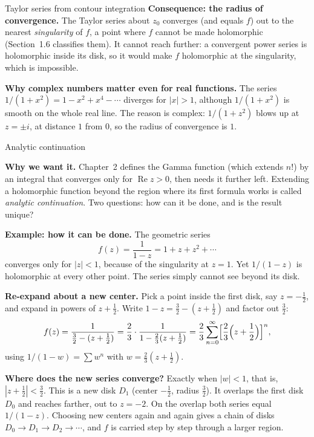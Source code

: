 \documentclass[11pt]{beamer}
\begin{document}
\begin{frame}[allowframebreaks=1.00]{Taylor series from contour integration}
\textbf{Consequence: the radius of convergence.} The Taylor series about \(z_0\) converges (and
equals \(f\)) out to the nearest \emph{singularity} of \(f\), a point where \(f\) cannot be made
holomorphic (Section~1.6 classifies them). It cannot reach further: a convergent power series is
holomorphic inside its disk, so it would make \(f\) holomorphic at the singularity, which is impossible.

\textbf{Why complex numbers matter even for real functions.} The series
\(1/(1+x^2)=1-x^2+x^4-\cdots\) diverges for \(|x|>1\), although \(1/(1+x^2)\) is smooth on the whole
real line. The reason is complex: \(1/(1+z^2)\) blows up at
\(z=\pm i\), at distance \(1\) from \(0\), so the radius of convergence is \(1\).
\end{frame}

\begin{frame}[allowframebreaks=1.00]{Analytic continuation}
\footnotesize

\textbf{Why we want it.} Chapter~2 defines the Gamma function (which extends \(n!\)) by an integral
that converges only for \(\operatorname{Re}z>0\), then needs it further left. Extending a holomorphic
function beyond the region where its first formula works is called \emph{analytic continuation}.
Two questions: how can it be done, and is the result unique?

\textbf{Example: how it can be done.} The geometric series
\[
 f(z)=\frac1{1-z}=1+z+z^2+\cdots
\]
converges only for \(|z|<1\), because of the singularity at \(z=1\). Yet \(1/(1-z)\) is holomorphic at
every other point. The series simply cannot see beyond its disk.

\textbf{Re-expand about a new center.} Pick a point inside the first disk, say \(z=-\tfrac12\), and
expand in powers of \(z+\tfrac12\). Write \(1-z=\tfrac32-(z+\tfrac12)\) and factor out \(\tfrac32\):
\[
    f(z)
    =\frac{1}{\frac32-(z+\frac12)}
    =\frac23\cdot
      \frac{1}{1-\frac23(z+\frac12)}
    =\frac23\sum_{n=0}^{\infty}
      \Bigl[\frac23\Bigl(z+\frac12\Bigr)\Bigr]^n,
\]
using \(1/(1-w)=\sum w^n\) with \(w=\frac23(z+\frac12)\).
\par\framebreak\par
\textbf{Where does the new series converge?} Exactly when \(|w|<1\), that is,
\(|z+\frac12|<\frac32\). This is a new disk \(D_1\) (center \(-\frac12\), radius \(\frac32\)). It overlaps the
first disk \(D_0\) and reaches farther, out to \(z=-2\). On the overlap both series equal
\(1/(1-z)\). Choosing new centers again and again gives a chain of disks
\(D_0\to D_1\to D_2\to\cdots\), and \(f\) is carried step by step through a larger region.


\end{frame}
\end{document}
